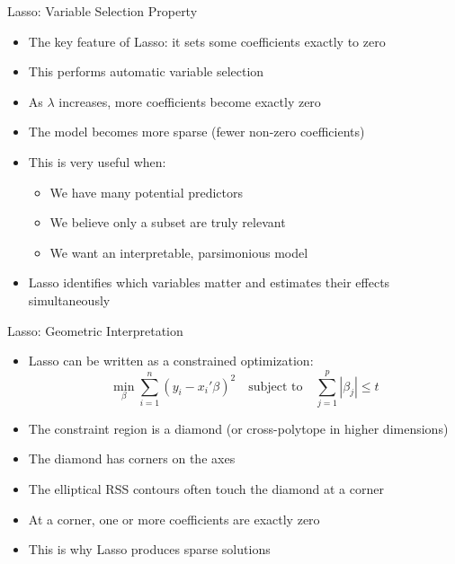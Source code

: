 \documentclass[aspectratio=169]{beamer}
\begin{document}
\begin{frame}{Lasso: Variable Selection Property}
\begin{itemize}
    \item The key feature of Lasso: it sets some coefficients exactly to zero
    \item This performs automatic variable selection
    \item As $\lambda$ increases, more coefficients become exactly zero
    \item The model becomes more sparse (fewer non-zero coefficients)
    \item This is very useful when:
    \begin{itemize}
        \item We have many potential predictors
        \item We believe only a subset are truly relevant
        \item We want an interpretable, parsimonious model
    \end{itemize}
    \item Lasso identifies which variables matter and estimates their effects simultaneously
\end{itemize}
\end{frame}

\begin{frame}{Lasso: Geometric Interpretation}
\begin{itemize}
    \item Lasso can be written as a constrained optimization:
    \[\min_{\beta} \sum_{i=1}^{n}(y_i - x_i'\beta)^2 \quad \text{subject to} \quad \sum_{j=1}^{p}|\beta_j| \leq t\]
    \item The constraint region is a diamond (or cross-polytope in higher dimensions)
    \item The diamond has corners on the axes
    \item The elliptical RSS contours often touch the diamond at a corner
    \item At a corner, one or more coefficients are exactly zero
    \item This is why Lasso produces sparse solutions
\end{itemize}
\end{frame}
\end{document}
